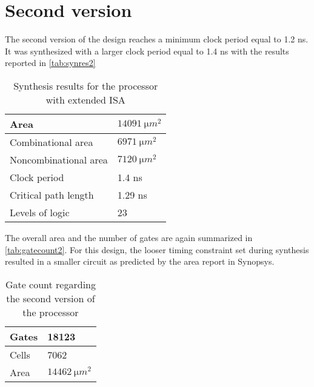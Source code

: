 \section{Second version}
The second version of the design reaches a minimum clock period equal to 1.2 ns. It was synthesized with a larger clock period equal to 1.4 ns with the results reported in \autoref{tab:synres2}
\begin{table}[htbp]
	\centering
	\begin{tabular}{|l|l|}
		\hline
		Area & $\SI{14091}{\micro m^2}$\\\hline
		Combinational area &  $\SI{6971}{\micro m^2}$\\\hline
		Noncombinational area & $\SI{7120}{\micro m^2}$\\\hline
		Clock period &  1.4 ns\\\hline
		Critical path length & 1.29 ns\\\hline
		Levels of logic & 23\\\hline

	\end{tabular}

	\caption{Synthesis results for the processor with extended ISA}
	\label{tab:synres2}
\end{table}
The overall area and the number of gates are again summarized in \autoref{tab:gatecount2}. For this design, the looser timing constraint set during synthesis resulted in a smaller circuit as predicted by the area report in Synopsys.
\begin{table}[htbp]
	\centering
	\begin{tabular}{|l|l|}\hline
		Gates &     18123 \\\hline Cells &   7062\\\hline Area &   $\SI{14462}{\micro m^2}$\\\hline
	\end{tabular}
	\caption{Gate count regarding the second version of the processor}
	\label{tab:gatecount2}
\end{table}
